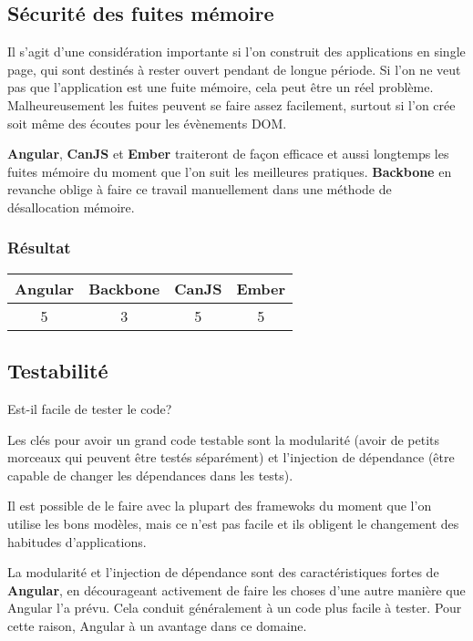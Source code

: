 \subsection{Sécurité des fuites mémoire}

Il s’agit d’une considération importante si l’on construit des applications en single page, qui sont destinés à rester ouvert pendant de longue période. Si l’on ne veut pas que l’application est une fuite mémoire, cela peut être un réel problème. Malheureusement les fuites peuvent se faire assez facilement, surtout si l’on crée soit même des écoutes pour les évènements DOM.

\textbf{Angular}, \textbf{CanJS} et \textbf{Ember} traiteront de façon efficace et aussi longtemps les fuites mémoire du moment que l’on suit les meilleures pratiques. \textbf{Backbone} en revanche oblige à faire ce travail manuellement dans une méthode de désallocation mémoire.



\subsubsection{Résultat}
\begin{tabular}{|c|c|c|c|}
  \hline 
  Angular & Backbone & CanJS & Ember \\
  \hline 
  5 & 3 & 5 & 5 \\
  \hline
\end{tabular}


\subsection{Testabilité}

Est-il facile de tester le code?

Les clés pour avoir un grand code testable sont la modularité (avoir de petits morceaux qui peuvent être testés séparément) et l’injection de dépendance (être capable de changer les dépendances dans les tests).

Il est possible de le faire avec la plupart des framewoks du moment que l’on utilise les bons modèles, mais ce n’est pas facile et ils obligent le changement des habitudes d’applications.

La modularité et l’injection de dépendance sont des caractéristiques fortes de \textbf{Angular}, en décourageant activement de faire les choses d’une autre manière que Angular l'a prévu. Cela conduit généralement à un code plus facile à tester. Pour cette raison, Angular à un avantage dans ce domaine.


